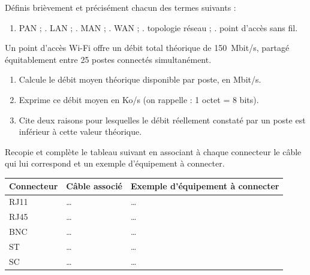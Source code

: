 \documentclass[11pt]{article}
\newcounter{popsec}
\newcounter{popsub}
\newcommand{\courssub}[1]{%
  \stepcounter{popsub}%
  \par\vspace{9pt}\noindent{\popxbold\fontsize{11.5}{13}\selectfont\color{popink}{\color{poporange}\thepopsec.\thepopsub}\hspace{6pt}#1}\par\nopagebreak\vspace{4pt}
}
\begin{document}
\begin{exercice}[Définitions]
Définis brièvement et précisément chacun des termes suivants :
\begin{enumerate}
  \item PAN ; . LAN ; . MAN ; . WAN ; . topologie réseau ; . point d'accès sans fil.
\end{enumerate}
\end{exercice}

\begin{exercice}
Un point d'accès Wi-Fi offre un débit total théorique de \SI{150}{Mbit/s}, partagé équitablement entre \num{25} postes connectés simultanément.
\begin{enumerate}
  \item Calcule le débit moyen théorique disponible par poste, en Mbit/s.
  \item Exprime ce débit moyen en Ko/s (on rappelle : 1 octet = 8 bits).
  \item Cite deux raisons pour lesquelles le débit réellement constaté par un poste est inférieur à cette valeur théorique.
\end{enumerate}
\end{exercice}

\courssub{Je m'entraîne}

\begin{exercice}
Recopie et complète le tableau suivant en associant à chaque connecteur le câble qui lui correspond et un exemple d'équipement à connecter.
\begin{center}
\begin{tabularx}{\linewidth}{|l|X|X|}
\hline
\rowcolor{popblueL} \textbf{Connecteur} & \textbf{Câble associé} & \textbf{Exemple d'équipement à connecter} \\
\hline
RJ11 & \ldots & \ldots \\
\hline
RJ45 & \ldots & \ldots \\
\hline
BNC & \ldots & \ldots \\
\hline
ST & \ldots & \ldots \\
\hline
SC & \ldots & \ldots \\
\hline
\end{tabularx}
\end{center}
\end{exercice}
\end{document}
